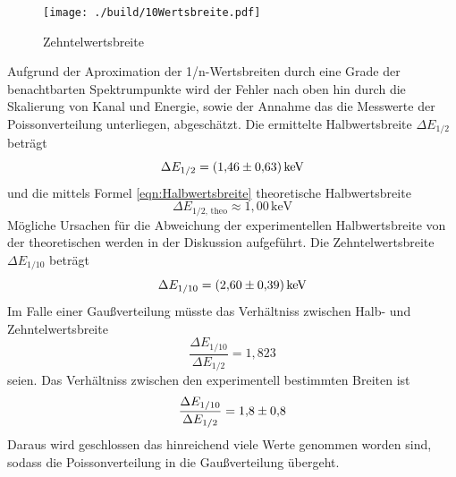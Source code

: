\begin{figure}[h]
  \centering
  \texttt{[image: ./build/10Wertsbreite.pdf]}
  \caption{Zehntelwertsbreite}
  \label{fig:Zehntel}
\end{figure}
Aufgrund der Aproximation der 1/n-Wertsbreiten durch eine Grade der benachtbarten Spektrumpunkte wird der Fehler nach oben hin durch die Skalierung von Kanal und Energie, sowie der Annahme das die Messwerte der Poissonverteilung unterliegen, abgeschätzt. Die ermittelte Halbwertsbreite $\Delta E_{1/2}$ beträgt
\begin{equation}
  \Delta E_{1/2} = (\num{1,46 +- 0,63}) \, \text{keV}
\end{equation}
und die mittels Formel \ref{eqn:Halbwertsbreite} theoretische Halbwertsbreite
\begin{equation}
  \Delta E_{1/2 \text{, theo}} \approx 1,00 \, \text{keV}
  \label{eqn:HalbTheo}
\end{equation}
Mögliche Ursachen für die Abweichung der experimentellen Halbwertsbreite von der theoretischen werden in der Diskussion aufgeführt. Die Zehntelwertsbreite $\Delta E_{1/10}$ beträgt
\begin{equation}
  \Delta E_{1/10} = (\num{2,60 +- 0,39}) \, \text{keV}
\end{equation}
Im Falle einer Gaußverteilung müsste das Verhältniss zwischen Halb- und Zehntelwertsbreite
\begin{equation}
  \frac{\Delta E_{1/10}}{\Delta E_{1/2}} = 1,823
\end{equation}
seien. Das Verhältniss zwischen den experimentell bestimmten Breiten ist
\begin{equation}
  \frac{\Delta E_{1/10}}{\Delta E_{1/2}} = \num{1,8 +- 0,8}
  \label{eqn:Ver}
\end{equation}
Daraus wird geschlossen das hinreichend viele Werte genommen worden sind, sodass die Poissonverteilung in die Gaußverteilung übergeht.

